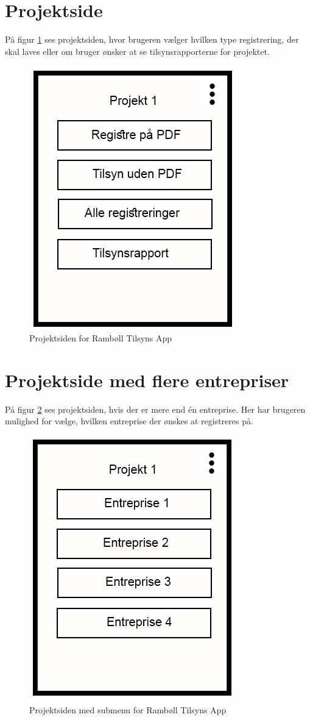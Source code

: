 \section{Projektside}\label{sec:ProjektsideMock}
På figur \ref{fig:ProjektsideMock} ses projektsiden, hvor brugeren vælger hvilken type registrering, der skal laves eller om bruger ønsker at se tilsynsrapporterne for projektet.

\begin{figure}[H]
	\centering
	\includegraphics[width=0.4\linewidth]{MockUps/Mock/Ramboell-Registrer}
	\caption{Projektsiden for Rambøll Tilsyns App}
	\label{fig:ProjektsideMock}
\end{figure}

\clearpage

\section{Projektside med flere entrepriser}\label{sec:ProjektsideEntrepriseMock}
På figur \ref{fig:ProjektsideEntrepriseMock} ses projektsiden, hvis der er mere end én entreprise. Her har brugeren mulighed for vælge, hvilken entreprise der ønskes at registreres på.

\begin{figure}[H]
	\centering
	\includegraphics[width=0.4\linewidth]{MockUps/Mock/Ramboell-Entreprise}
	\caption{Projektsiden med submenu for Rambøll Tilsyns App}
	\label{fig:ProjektsideEntrepriseMock}
\end{figure}

